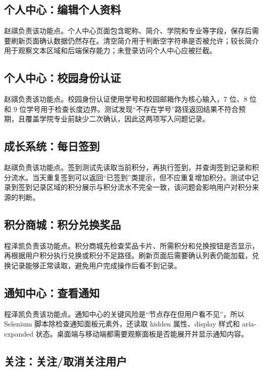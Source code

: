 \documentclass[bwprint]{report}
\begin{document}
\subsection{个人中心：编辑个人资料}

赵祺负责该功能点。个人中心页面包含昵称、简介、学院和专业等字段，保存后需要刷新页面确认数据仍然存在。清空简介用于判断空字符串是否被允许；较长简介用于观察文本区域和后端保存能力；未登录访问个人中心应被拦截。

\subsection{个人中心：校园身份认证}

赵祺负责该功能点。校园身份认证使用学号和校园邮箱作为核心输入，7 位、8 位和 9 位学号用于检查长度边界。测试发现“不存在学号”路径返回结果不符合预期，且覆盖学院专业前缺少二次确认，因此这两项写入问题记录。

\subsection{成长系统：每日签到}

赵祺负责该功能点。签到测试先读取当前积分，再执行签到，并查询签到记录和积分流水。当天重复签到可以返回“已签到”类提示，但不应重复增加积分。测试中记录到签到记录区域的积分展示与积分流水不完全一致，该问题会影响用户对积分来源的判断。

\subsection{积分商城：积分兑换奖品}

程泽凯负责该功能点。积分商城先检查奖品卡片、所需积分和兑换按钮是否显示，再根据用户积分执行兑换或积分不足路径。刷新页面后需要确认列表仍能加载，兑换记录能够正常读取，避免用户完成操作后看不到记录。

\subsection{通知中心：查看通知}

程泽凯负责该功能点。通知中心的关键风险是“节点存在但用户看不见”，所以 Selenium 脚本除检查通知面板元素外，还读取 hidden 属性、display 样式和 aria-expanded 状态。桌面端与移动端都需要观察面板是否能展开并显示通知内容。

\subsection{关注：关注/取消关注用户}
\end{document}
